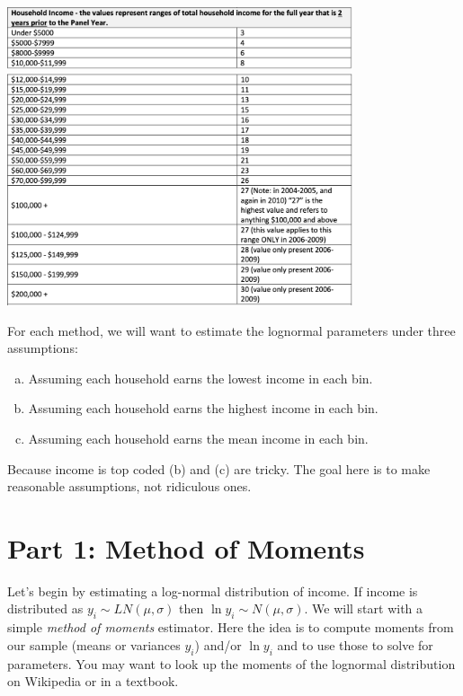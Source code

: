 \documentclass{article}
\begin{document}
\begin{center}
\includegraphics[width=4in]{./income_1.png}\\
\includegraphics[width=4in]{./income_2.png}
\end{center}

\noindent For each method, we will want to estimate the lognormal parameters under three assumptions:
\begin{enumerate}[(a)]
\item Assuming each household earns the lowest income in each bin.
\item Assuming each household earns the highest income in each bin.
\item Assuming each household earns the mean income in each bin.
\end{enumerate}
Because income is top coded (b) and (c) are tricky. The goal here is to make reasonable assumptions, not ridiculous ones.

\section*{\normalsize Part 1: Method of Moments}
Let's begin by estimating a log-normal distribution of income. If income is distributed as $y_i  \sim LN (\mu,\sigma)$ then $\ln y_i \sim N(\mu,\sigma)$. We will start with a simple \textit{method of moments} estimator. Here the idea is to compute moments from our sample (means or variances $y_i$) and/or $\ln y_i$ and to use those to solve for parameters. You may want to look up the moments of the lognormal distribution on Wikipedia or in a textbook.
\end{document}
